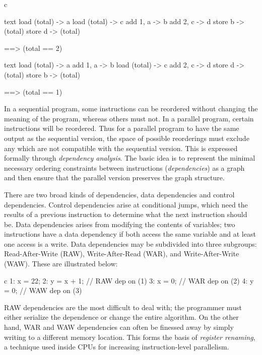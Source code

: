 \documentclass[conference, a4paper]{IEEEtran-modified}
\begin{document}
\begin{ccode}[]{c}
\begin{multicols}{2}
      \begin{ccode}[after skip=4pt]
        {text}
        load (total) -> a
          load (total) -> c
        add 1, a -> b
          add 2, c -> d
        store b -> (total)
          store d -> (total)

          ==> (total == 2)\end{ccode}
      \begin{ccode}[]
        {text}
        load (total) -> a
        add 1, a -> b
          load (total) -> c
          add 2, c -> d
          store d -> (total)
        store b -> (total)
        
          ==> (total == 1)\end{ccode}
\end{multicols}

In a sequential program, some instructions can be reordered without changing the meaning of the program, whereas others must not. In a parallel program, certain instructions will be reordered. Thus for a parallel program to have the same output as the sequential version, the space of possible reorderings must exclude any which are not compatible with the sequential version. This is expressed formally through \emph{dependency analysis}. The basic idea is to represent the minimal necessary ordering constraints between instructions (\emph{dependencies}) as a graph and then ensure that the parallel version preserves the graph structure. 

There are two broad kinds of dependencies, data dependencies and control dependencies. Control dependencies arise at conditional jumps, which need the results of a previous instruction to determine what the next instruction should be. Data dependencies arises from modifying the contents of variables; two instructions have a data dependency if both access the same variable and at least one access is a write. Data dependencies may be subdivided into three subgroups: Read-After-Write (RAW), Write-After-Read (WAR), and Write-After-Write (WAW). These are illustrated below:

      \begin{ccode}[]
        {c}
        1: x = 22;
        2: y = x + 1;     // RAW dep on (1)
        3: x = 0;         // WAR dep on (2)
        4: y = 0;         // WAW dep on (3)\end{ccode}


RAW dependencies are the most difficult to deal with; the programmer must either serialize the dependence or change the entire algorithm. On the other hand, WAR and WAW dependencies can often be finessed away by simply writing to a different memory location. This forms the basis of \emph{register renaming}, a technique used inside CPUs for increasing instruction-level parallelism. 



\end{ccode}
\end{document}
